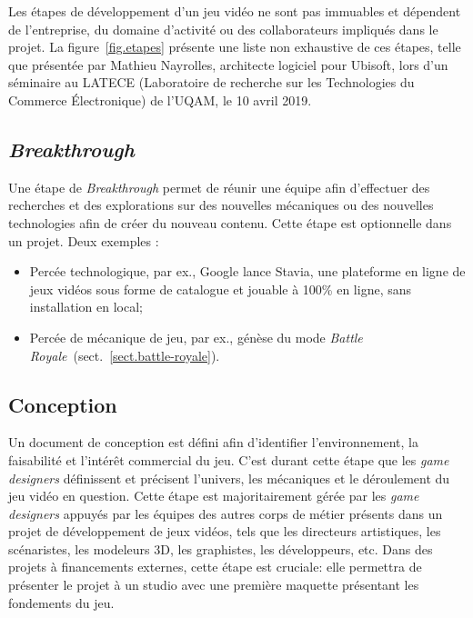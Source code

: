 Les étapes de développement d'un jeu vidéo ne sont pas immuables et dépendent de l'entreprise, du domaine d'activité ou des collaborateurs impliqués dans le projet.
La figure~\ref{fig.etapes} présente une liste non exhaustive de ces étapes, telle que présentée par Mathieu Nayrolles, architecte logiciel pour Ubisoft, lors d’un séminaire au LATECE (Laboratoire de recherche sur les Technologies du Commerce Électronique) de l’UQAM, le 10 avril 2019.



\subsection{\emph{Breakthrough}}

Une étape de \emph{Breakthrough} permet de réunir une équipe afin d'effectuer des recherches et des explorations sur des nouvelles mécaniques ou des nouvelles technologies afin de créer du nouveau contenu.
Cette étape est optionnelle dans un projet.
Deux exemples :
\begin{itemize}
    \item Percée technologique, par ex., Google lance Stavia, une plateforme en ligne de jeux vidéos sous forme de catalogue et jouable à 100\% en ligne, sans installation en local;

    \item Percée de mécanique de jeu, par ex., g\'en\`ese du mode \emph{Battle Royale}~(sect.~\ref{sect.battle-royale}).
\end{itemize}

\subsection{Conception}

Un document de conception est défini afin d'identifier l'environnement, la faisabilité et l'intérêt commercial du jeu.
C'est durant cette étape que les \emph{game designers} définissent et précisent l'univers, les mécaniques et le déroulement du jeu vidéo en question.
Cette étape est majoritairement gérée par les \emph{game designers} appuyés par les équipes des autres corps de métier présents dans un projet de développement de jeux vidéos, tels que les directeurs artistiques, les scénaristes, les modeleurs 3D, les graphistes, les développeurs, etc.
Dans des projets à financements externes, cette étape est cruciale: elle permettra de présenter le projet à un studio avec une première maquette présentant les fondements du jeu.

